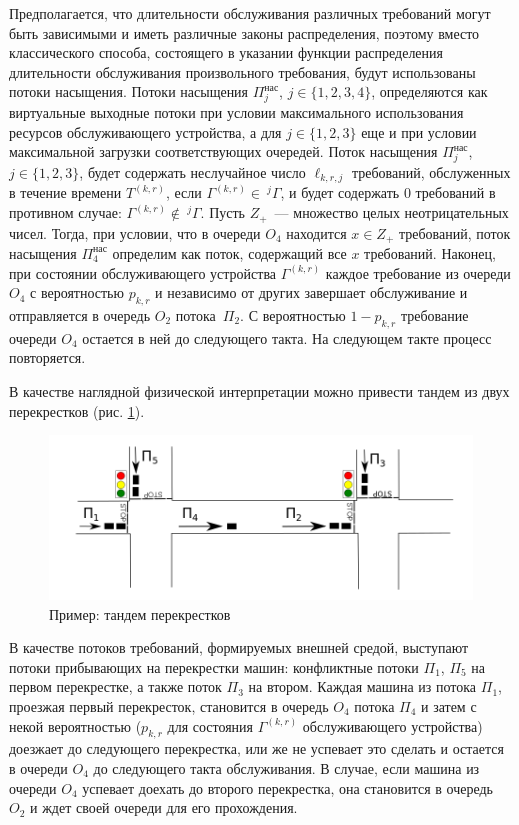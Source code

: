 \documentclass[a4paper,12pt,russian]{extarticle}
\newcommand{\G}{\Gamma}
\newcommand{\ga}[1]{\Gamma^{\left( #1 \right)} }
\newcommand{\Tt}[1]{T^{\left( #1 \right)} }
\begin{document}
Предполагается, что длительности обслуживания различных требований могут быть зависимыми и иметь различные законы распределения, поэтому вместо классического способа, состоящего в указании функции распределения длительности обслуживания произвольного требования, будут использованы потоки насыщения. Потоки насыщения $\Pi^{\mathrm{\text{нас}}}_j$, $j \in \{1,2,3,4\}$, определяются как виртуальные выходные потоки при 
условии максимального использования ресурсов обслуживающего устройства, а для $j\in \{1, 2, 3\}$ еще и при условии максимальной загрузки соответствующих очередей. Поток насыщения $\Pi^{\mathrm{\text{нас}}}_j$, $j\in \{1,2,3\}$, будет содержать неслучайное число $\ell_{k,r,j}$ требований, обслуженных в течение времени $\Tt{k,r}$, если $\ga{k,r} \in~^j\G$, и будет содержать $0$ требований в противном случае: $\ga{k,r} \notin ~^j\G$. Пусть $Z_+$~--- множество целых неотрицательных чисел. Тогда, при условии, что в очереди $O_4$ находится $x \in Z_+$ требований, поток насыщения $\Pi^{\mathrm{\text{нас}}}_4$ определим как поток, содержащий все $x$ требований.
Наконец, при состоянии обслуживающего устройства $\ga{k,r}$ каждое требование из очереди $O_4$ с вероятностью $p_{k,r}$ и независимо от других завершает обслуживание и отправляется в очередь $O_2$ потока~$\Pi_2$. С вероятностью $1-p_{k,r}$ требование очереди $O_4$ остается в ней до следующего такта. На следующем такте процесс повторяется.

В качестве наглядной физической интерпретации можно привести тандем из двух перекрестков (рис. \ref{crossroads}).
\begin{figure}[h]
\includegraphics[scale=0.5]{Crossroads.png} 
\caption{Пример: тандем перекрестков}
\label{crossroads}
\end{figure}
В качестве потоков требований, формируемых внешней средой, выступают потоки прибывающих на перекрестки машин: конфликтные потоки $\Pi_1$, $\Pi_5$ на первом перекрестке, а также поток $\Pi_3$ на втором. Каждая машина из потока $\Pi_1$, проезжая первый перекресток, становится в очередь $O_4$ потока $\Pi_4$ и затем с некой вероятностью ($p_{k,r}$ для состояния $\ga{k,r}$ обслуживающего устройства) доезжает до следующего перекрестка, или же не успевает это сделать и остается в очереди $O_4$ до следующего такта обслуживания. В случае, если машина из очереди $O_4$ успевает доехать до второго перекрестка, она становится в очередь $O_2$ и ждет своей очереди для его прохождения.
\end{document}
